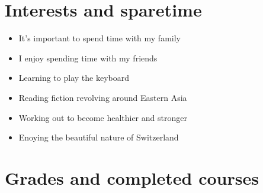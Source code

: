 \documentclass[letterpaper]{twentysecondcv} %
\begin{document}
\section{Interests and sparetime}

\begin{itemize}
    \item It's important to spend time with my family
    \item I enjoy spending time with my friends
    \item Learning to play the keyboard
    \item Reading fiction revolving around Eastern Asia
    \item Working out to become healthier and stronger
    \item Enoying the beautiful nature of Switzerland
\end{itemize}

\newpage        %
\makeprofile    %

\section{Grades and completed courses}
\end{document}
